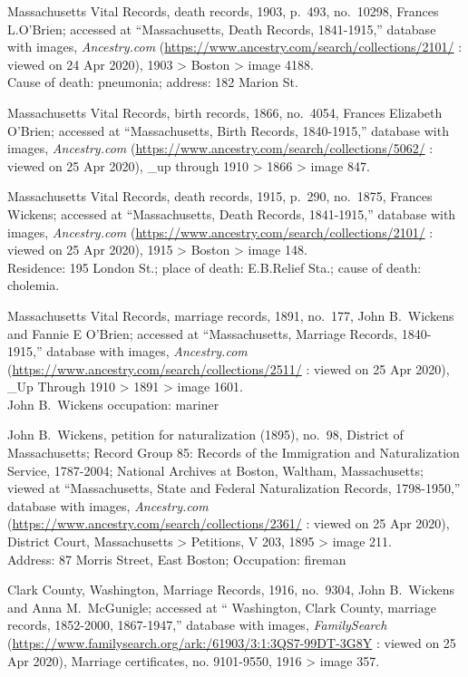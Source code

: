 \begin{thebibliography}{999}
	Massachusetts Vital Records, death records, 1903, p.\ 493, no.\ 10298, Frances L.O'Brien; accessed at ``Massachusetts, Death Records, 1841-1915,'' database with images, \textit{Ancestry.com} (\url{https://www.ancestry.com/search/collections/2101/} : viewed on 24 Apr 2020), 1903 > Boston > image 4188.\\
	Cause of death: pneumonia; address: 182 Marion St.
	
	Massachusetts Vital Records, birth records, 1866, no.\ 4054, Frances Elizabeth O'Brien; accessed at ``Massachusetts, Birth Records, 1840-1915,'' database with images, \textit{Ancestry.com} (\url{https://www.ancestry.com/search/collections/5062/} : viewed on 25 Apr 2020), \_up through 1910 > 1866 > image 847.
	
	Massachusetts Vital Records, death records, 1915, p.\ 290, no.\ 1875, Frances Wickens; accessed at ``Massachusetts, Death Records, 1841-1915,'' database with images, \textit{Ancestry.com} (\url{https://www.ancestry.com/search/collections/2101/} : viewed on 25 Apr 2020), 1915 > Boston > image 148.\\
	Residence: 195 London St.; place of death: E.B.Relief Sta.; cause of death: cholemia.
	
	Massachusetts Vital Records, marriage records, 1891, no.\ 177, John B.\ Wickens and Fannie E O'Brien; accessed at ``Massachusetts, Marriage Records, 1840-1915,'' database with images, \textit{Ancestry.com} (\url{https://www.ancestry.com/search/collections/2511/} : viewed on 25 Apr 2020), \_Up Through 1910 > 1891 > image 1601.\\
	John B.\ Wickens occupation: mariner
	
	John B.\ Wickens, petition for naturalization (1895), no.\ 98, District of Massachusetts; Record Group 85: Records of the Immigration and Naturalization Service, 1787-2004; National Archives at Boston, Waltham, Massachusetts; viewed at ``Massachusetts, State and Federal Naturalization Records, 1798-1950,'' database with images, \textit{Ancestry.com} (\url{https://www.ancestry.com/search/collections/2361/} : viewed on 25 Apr 2020), District Court, Massachusetts > Petitions, V 203, 1895 > image 211.\\
	Address: 87 Morris Street, East Boston; Occupation: fireman
	
	Clark County, Washington, Marriage Records, 1916, no.\ 9304, John B.\ Wickens and Anna M.\ McGunigle; accessed at `` Washington, Clark County, marriage records, 1852-2000, 1867-1947,'' database with images, \textit{FamilySearch} (\url{https://www.familysearch.org/ark:/61903/3:1:3QS7-99DT-3G8Y} : viewed on 25 Apr 2020), Marriage certificates, no. 9101-9550, 1916 > image 357.
	

\end{thebibliography}
